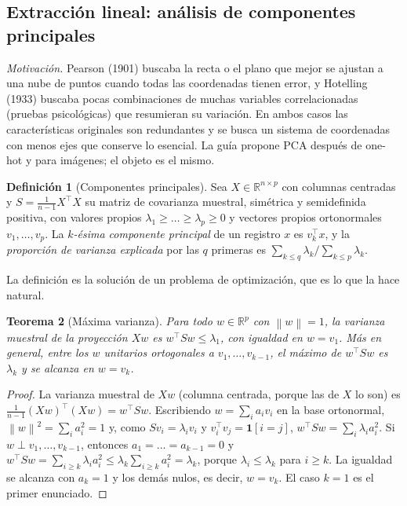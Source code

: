 \documentclass[11pt]{article}
\newtheorem{teorema}{Teorema}[section]
\theoremstyle{definition}
\newtheorem{definicion}[teorema]{Definición}
\theoremstyle{remark}
\newcommand{\R}{\mathbb{R}}
\newcommand{\ind}[1]{\mathbf{1}\!\left[#1\right]}
\newcommand{\norm}[1]{\left\lVert #1\right\rVert}
\begin{document}
\subsection{Extracción lineal: análisis de componentes principales}\label{sec:pca}

\noindent \emph{Motivación.} Pearson (1901) buscaba la recta o el plano que mejor se ajustan a una nube de puntos cuando todas las coordenadas tienen error, y Hotelling (1933) buscaba pocas combinaciones de muchas variables correlacionadas (pruebas psicológicas) que resumieran su variación. En ambos casos las características originales son redundantes y se busca un sistema de coordenadas con menos ejes que conserve lo esencial. La guía propone PCA después de one-hot y para imágenes; el objeto es el mismo.

\begin{definicion}[Componentes principales]\label{def:pca}
\noindent Sea $X\in\R^{n\times p}$ con columnas centradas y $S=\frac1{n-1}X^\top X$ su matriz de covarianza muestral, simétrica y semidefinida positiva, con valores propios $\lambda_1\ge\dots\ge\lambda_p\ge0$ y vectores propios ortonormales $v_1,\dots,v_p$. La \emph{$k$-ésima componente principal} de un registro $x$ es $v_k^\top x$, y la \emph{proporción de varianza explicada} por las $q$ primeras es $\sum_{k\le q}\lambda_k/\sum_{k\le p}\lambda_k$.
\end{definicion}

\noindent La definición es la solución de un problema de optimización, que es lo que la hace natural.

\begin{teorema}[Máxima varianza]\label{teo:pca}
\noindent Para todo $w\in\R^p$ con $\norm{w}=1$, la varianza muestral de la proyección $Xw$ es $w^\top Sw\le\lambda_1$, con igualdad en $w=v_1$. Más en general, entre los $w$ unitarios ortogonales a $v_1,\dots,v_{k-1}$, el máximo de $w^\top Sw$ es $\lambda_k$ y se alcanza en $w=v_k$.
\end{teorema}
\begin{proof}
\noindent La varianza muestral de $Xw$ (columna centrada, porque las de $X$ lo son) es $\frac1{n-1}(Xw)^\top(Xw)=w^\top Sw$. Escribiendo $w=\sum_ia_iv_i$ en la base ortonormal, $\norm{w}^2=\sum_ia_i^2=1$ y, como $Sv_i=\lambda_iv_i$ y $v_i^\top v_j=\ind{i=j}$, $w^\top Sw=\sum_i\lambda_ia_i^2$. Si $w\perp v_1,\dots,v_{k-1}$, entonces $a_1=\dots=a_{k-1}=0$ y $w^\top Sw=\sum_{i\ge k}\lambda_ia_i^2\le\lambda_k\sum_{i\ge k}a_i^2=\lambda_k$, porque $\lambda_i\le\lambda_k$ para $i\ge k$. La igualdad se alcanza con $a_k=1$ y los demás nulos, es decir, $w=v_k$. El caso $k=1$ es el primer enunciado.
\end{proof}
\end{document}
